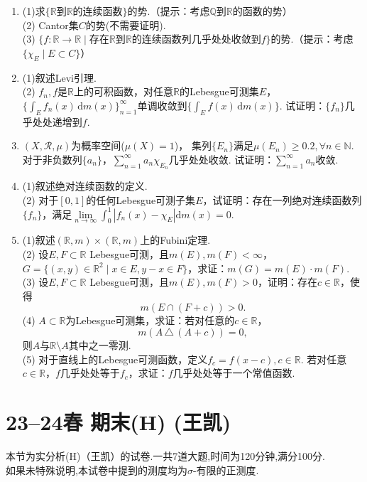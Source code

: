 \begin{enumerate}
    \item[I](1)求$\{\mathbb{R}$到$\mathbb{R}$的连续函数$\!\}$的势.（提示：考虑$\mathbb{Q}$到$\mathbb{R}$的函数的势）\\
    (2) Cantor集$C$的势(不需要证明).\\
    (3) $\{f:\mathbb{R}\to \mathbb{R}\mid$存在$\mathbb{R}$到$\mathbb{R}$的连续函数列几乎处处收敛到$f\}$的势.（提示：考虑$\{\chi_E\mid E\subset C\}$）

    \item[II](1)叙述Levi引理.\\
    (2) $f_n,f$是$\mathbb{R}$上的可积函数，对任意$\mathbb{R}$的Lebesgue可测集$E$，
    $\{\int_E f_n(x)\,\mathrm{d}m(x)\}_{n=1}^\infty$单调收敛到$\{\int_E f(x)\,\mathrm{d}m(x)\}$. 
    试证明：$\{f_n\}$几乎处处递增到$f$.

    \item[III]$(X,\mathcal{R},\mu)$为概率空间($\mu(X)=1$)，
    集列$\{E_n\}$满足$\mu(E_n)\geq 0.2,\forall n\in \mathbb{N}$.
    对于非负数列$\{a_n\}$，$\sum\limits_{n=1}^\infty a_n\chi_{E_n}$几乎处处收敛. 
    试证明：$\sum\limits_{n=1}^\infty a_n$收敛.

    \item[IV](1)叙述绝对连续函数的定义.\\
    (2) 对于$[0,1]$的任何Lebesgue可测子集$E$，试证明：存在一列绝对连续函数列$\{f_n\}$，满足$\lim\limits_{n\to \infty} \int_{0}^{1}\left|f_n(x)-\chi_E \right| \mathrm{d}m(x)=0$.

    \item[V](1)叙述$(\mathbb{R},m)\times (\mathbb{R},m)$上的Fubini定理.\\
    (2) 设$E,F\subset\mathbb{R}$ Lebesgue可测，且$m(E),m(F)<\infty$，$G=\{(x,y)\in \mathbb{R}^2\mid x\in E, y-x\in F\}$，求证：$m(G)=m(E)\cdot m(F)$.\\
    (3) 设$E,F\subset\mathbb{R}$ Lebesgue可测，且$m(E),m(F)>0$，证明：存在$c\in \mathbb{R}$，使得
    \[ m(E\cap (F+c))>0.\]
    (4) $A\subset \mathbb{R}$为Lebesgue可测集，求证：若对任意的$c\in \mathbb{R}$，
    \[m(A\,\triangle\,(A+c))=0,\]
    则$A$与$\mathbb{R} \setminus A$其中之一零测.\\
    (5) 对于直线上的Lebesgue可测函数，定义$f_c=f(x-c),c\in \mathbb{R}$. 
    若对任意$c\in \mathbb{R}$，$f$几乎处处等于$f_c$，求证：$f$几乎处处等于一个常值函数.
\end{enumerate}


\section{23--24春 期末(H) (王凯)} 
本节为实分析(H)（王凯）的试卷.一共7道大题,时间为120分钟,满分100分.\\
    如果未特殊说明,本试卷中提到的测度均为$\sigma$-有限的正测度.

